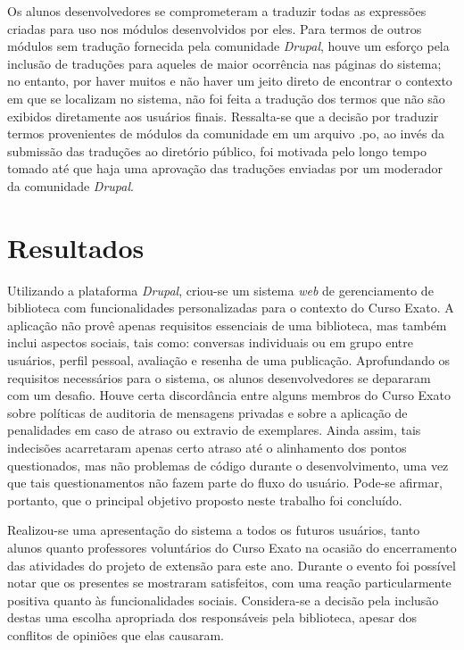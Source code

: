 \documentclass[a4paper]{article}
\begin{document}
Os alunos desenvolvedores se comprometeram a traduzir todas as expressões criadas para uso nos módulos desenvolvidos por eles. Para termos de outros módulos sem tradução fornecida pela comunidade \textit{Drupal}, houve um esforço pela inclusão de traduções para aqueles de maior ocorrência nas páginas do sistema; no entanto, por haver muitos e não haver um jeito direto de encontrar o contexto em que se localizam no sistema, não foi feita a tradução dos termos que não são exibidos diretamente aos usuários finais. Ressalta-se que a decisão por traduzir termos provenientes de módulos da comunidade em um arquivo .po, ao invés da submissão das traduções ao diretório público, foi motivada pelo longo tempo tomado até que haja uma aprovação das traduções enviadas por um moderador da comunidade \textit{Drupal}.

\section{Resultados} \label{sssec:improvements}
Utilizando a plataforma \textit{Drupal}, criou-se um sistema \textit{web} de gerenciamento de biblioteca com funcionalidades personalizadas para o contexto do Curso Exato. A aplicação não provê apenas requisitos essenciais de uma biblioteca, mas também inclui aspectos sociais, tais como: conversas individuais ou em grupo entre usuários, perfil pessoal, avaliação e resenha de uma publicação. Aprofundando os requisitos necessários para o sistema, os alunos desenvolvedores se depararam com um desafio. Houve certa discordância entre alguns membros do Curso Exato sobre políticas de auditoria de mensagens privadas e sobre a aplicação de penalidades em caso de atraso ou extravio de exemplares. Ainda assim, tais indecisões acarretaram apenas certo atraso até o alinhamento dos pontos questionados, mas não problemas de código durante o desenvolvimento, uma vez que tais questionamentos não fazem parte do fluxo do usuário. Pode-se afirmar, portanto, que o principal objetivo proposto neste trabalho foi concluído. 

Realizou-se uma apresentação do sistema a todos os futuros usuários, tanto alunos quanto professores voluntários do Curso Exato na ocasião do encerramento das atividades do projeto de extensão para este ano. Durante o evento foi possível notar que os presentes se mostraram satisfeitos, com uma reação particularmente positiva quanto às funcionalidades sociais. Considera-se a decisão pela inclusão destas uma escolha apropriada dos responsáveis pela biblioteca, apesar dos conflitos de opiniões que elas causaram.
\end{document}
